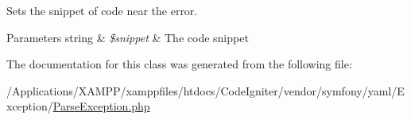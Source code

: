 Sets the snippet of code near the error.


\begin{DoxyParams}[1]{Parameters}
string & {\em \$snippet} & The code snippet \\
\hline
\end{DoxyParams}


The documentation for this class was generated from the following file\+:\begin{DoxyCompactItemize}
\item 
/\+Applications/\+X\+A\+M\+P\+P/xamppfiles/htdocs/\+Code\+Igniter/vendor/symfony/yaml/\+Exception/\mbox{\hyperlink{_parse_exception_8php}{Parse\+Exception.\+php}}\end{DoxyCompactItemize}
